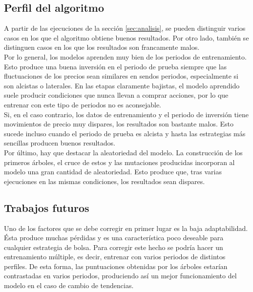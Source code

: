 \subsection{Perfil del algoritmo}

A partir de las ejecuciones de la secci\'on \ref{sec:analisis}, se pueden distinguir varios casos en los que el algoritmo obtiene buenos resultados. Por otro lado, tambi\'en se distinguen casos en los que los resultados son francamente malos.\\

Por lo general, los modelos aprenden muy bien de los periodos de entrenamiento. Esto produce una buena inversi\'on en el periodo de prueba siempre que las fluctuaciones de los precios sean similares en sendos periodos, especialmente si son alcistas o laterales. En las etapas claramente bajistas, el modelo aprendido suele producir condiciones que nunca llevan a comprar acciones, por lo que entrenar con este tipo de periodos no es aconsejable.\\

Si, en el caso contrario, los datos de entrenamiento y el periodo de inversi\'on tiene movimientos de precio muy dispares, los resultados son bastante malos. Esto sucede incluso cuando el periodo de prueba es alcista y hasta las estrategias m\'as sencillas producen buenos resultados.\\

Por \'ultimo, hay que destacar la aleatoriedad del modelo. La construcci\'on de los primeros \'arboles, el cruce de estos y las mutaciones producidas incorporan al modelo una gran cantidad de aleatoriedad. Esto produce que, tras varias ejecuciones en las mismas condiciones, los resultados sean dispares. 

\subsection{Trabajos futuros}

Uno de los factores que se debe corregir en primer lugar es la baja adaptabilidad. \'Esta produce muchas p\'erdidas y es una caracter\'istica poco deseable para cualquier estrategia de bolsa. Para corregir este hecho se podr\'ia hacer un entrenamiento m\'ultiple, es decir, entrenar con varios periodos de distintos perfiles. De esta forma, las puntuaciones obtenidas por los \'arboles estar\'ian contrastadas en varios periodos, produciendo as\'i un mejor funcionamiento del modelo en el caso de cambio de tendencias.\\

